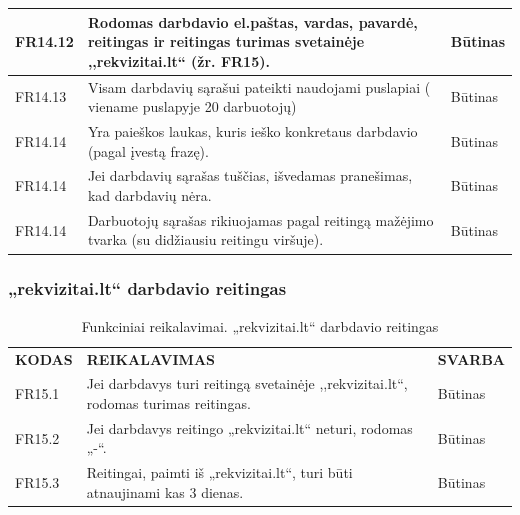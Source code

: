 \documentclass{VUMIFPSkursinis}
\begin{document}
\begin{table}[H]
\begin{tabular}{|p{2cm}|p{10cm}|p{3cm}|}
FR14.12 & \multicolumn{1}{m{10cm}|}{Rodomas darbdavio el.paštas, vardas, pavardė, reitingas ir reitingas turimas svetainėje ,,rekvizitai.lt“ (žr. FR15).} & Būtinas \\ \hline
FR14.13 & \multicolumn{1}{m{10cm}|}{Visam darbdavių sąrašui pateikti naudojami puslapiai ( viename puslapyje 20 darbuotojų)} & Būtinas \\ \hline
FR14.14 & \multicolumn{1}{m{10cm}|}{Yra paieškos laukas, kuris ieško konkretaus darbdavio (pagal įvestą frazę).} & Būtinas \\ \hline
FR14.14 & \multicolumn{1}{m{10cm}|}{Jei darbdavių sąrašas tuščias, išvedamas pranešimas, kad darbdavių nėra.} & Būtinas \\ \hline
FR14.14 & \multicolumn{1}{m{10cm}|}{Darbuotojų sąrašas rikiuojamas pagal reitingą mažėjimo tvarka (su didžiausiu reitingu viršuje).} & Būtinas \\ \hline
\end{tabular}
\end{table}


\subsubsection{„rekvizitai.lt“ darbdavio reitingas}
\begin{table}[H]
\caption{Funkciniai reikalavimai. „rekvizitai.lt“ darbdavio reitingas}
\centering
\normalsize
\begin{tabular}{|p{2cm}|p{10cm}|p{3cm}|}
\hline
\rowcolor{gray!30}
\multicolumn{3}{|l|}{\textbf{15. „rekvizitai.lt“ darbdavio reitingas}} \\ \hline
\textbf{KODAS}& \multicolumn{1}{m{10cm}|}{\textbf{REIKALAVIMAS}} & \textbf{SVARBA} \\ \hline
FR15.1 & \multicolumn{1}{m{10cm}|}{Jei darbdavys turi reitingą svetainėje ,,rekvizitai.lt“, rodomas turimas reitingas.} & Būtinas \\ \hline
FR15.2 & \multicolumn{1}{m{10cm}|}{Jei darbdavys reitingo „rekvizitai.lt“ neturi, rodomas „-“.} & Būtinas \\ \hline
FR15.3 & \multicolumn{1}{m{10cm}|}{Reitingai, paimti iš „rekvizitai.lt“, turi būti atnaujinami kas 3 dienas.} & Būtinas \\ \hline
\end{tabular}
\end{table}
\end{document}
